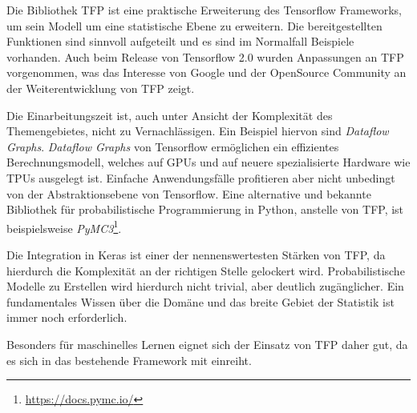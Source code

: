 \documentclass[12pt]{article}
\begin{document}
Die Bibliothek TFP ist eine praktische Erweiterung des Tensorflow Frameworks, um sein Modell um eine statistische Ebene zu erweitern. Die bereitgestellten Funktionen sind sinnvoll aufgeteilt und es sind im Normalfall Beispiele vorhanden. Auch beim Release von Tensorflow 2.0 wurden Anpassungen an TFP vorgenommen, was das Interesse von Google und der OpenSource Community an der Weiterentwicklung von TFP zeigt. 

Die Einarbeitungszeit ist, auch unter Ansicht der Komplexität des Themengebietes, nicht zu Vernachlässigen. Ein Beispiel hiervon sind \textit{Dataflow Graphs}. \textit{Dataflow Graphs} von Tensorflow ermöglichen ein effizientes Berechnungsmodell, welches auf GPUs und auf neuere spezialisierte Hardware wie TPUs ausgelegt ist. Einfache Anwendungsfälle profitieren aber nicht unbedingt von der Abstraktionsebene von Tensorflow. Eine alternative und bekannte Bibliothek für probabilistische Programmierung in Python, anstelle von TFP, ist beispielsweise \textit{PyMC3}\footnote{\url{https://docs.pymc.io/}}.

Die Integration in Keras ist einer der nennenswertesten Stärken von TFP, da hierdurch die Komplexität an der richtigen Stelle gelockert wird. Probabilistische Modelle zu Erstellen wird hierdurch nicht trivial, aber deutlich zugänglicher. Ein fundamentales Wissen über die Domäne und das breite Gebiet der Statistik ist immer noch erforderlich. 

Besonders für maschinelles Lernen eignet sich der Einsatz von TFP daher gut, da es sich in das bestehende Framework mit einreiht.


\newpage



\listoffigures
\lstlistoflistings
\end{document}

